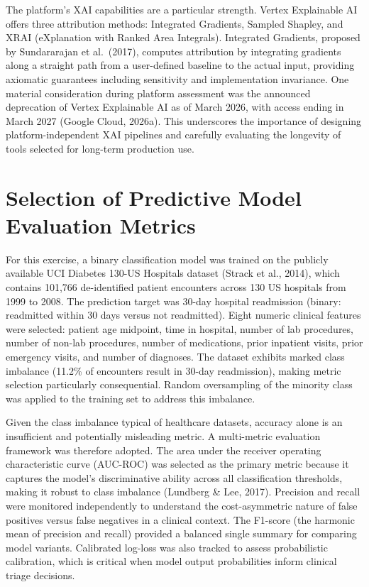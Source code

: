 \documentclass[12pt,letterpaper]{article}
\begin{document}
The platform's XAI capabilities are a particular strength. Vertex Explainable AI
offers three attribution methods: Integrated Gradients, Sampled Shapley, and
XRAI (eXplanation with Ranked Area Integrals). Integrated Gradients, proposed by
Sundararajan et al.\ (2017), computes attribution by integrating gradients along a
straight path from a user-defined baseline to the actual input, providing axiomatic
guarantees including sensitivity and implementation invariance. One material
consideration during platform assessment was the announced deprecation of Vertex
Explainable AI as of March 2026, with access ending in March 2027 (Google Cloud,
2026a). This underscores the importance of designing platform-independent XAI
pipelines and carefully evaluating the longevity of tools selected for long-term
production use.

\section{Selection of Predictive Model Evaluation Metrics}

For this exercise, a binary classification model was trained on the publicly
available UCI Diabetes 130-US Hospitals dataset (Strack et al., 2014), which
contains 101{,}766 de-identified patient encounters across 130 US hospitals from
1999 to 2008. The prediction target was 30-day hospital readmission (binary:
readmitted within 30 days versus not readmitted). Eight numeric clinical features
were selected: patient age midpoint, time in hospital, number of lab procedures,
number of non-lab procedures, number of medications, prior inpatient visits,
prior emergency visits, and number of diagnoses. The dataset exhibits marked class
imbalance (11.2\% of encounters result in 30-day readmission), making metric
selection particularly consequential. Random oversampling of the minority class
was applied to the training set to address this imbalance.

Given the class imbalance typical of healthcare datasets, accuracy alone is an
insufficient and potentially misleading metric. A multi-metric evaluation framework
was therefore adopted. The area under the receiver operating characteristic curve
(AUC-ROC) was selected as the primary metric because it captures the model's
discriminative ability across all classification thresholds, making it robust to
class imbalance (Lundberg \& Lee, 2017). Precision and recall were monitored
independently to understand the cost-asymmetric nature of false positives versus
false negatives in a clinical context. The F1-score (the harmonic mean of
precision and recall) provided a balanced single summary for comparing model
variants. Calibrated log-loss was also tracked to assess probabilistic calibration,
which is critical when model output probabilities inform clinical triage decisions.
\end{document}
